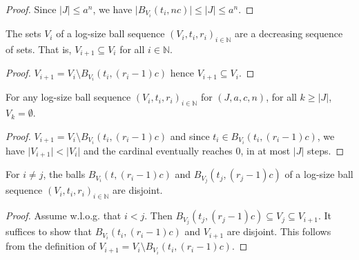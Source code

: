 \begin{proof}
Since $|J| \le a^n$, we have $\vert B_{V_i}(t_i, n c) \vert \le \vert J \vert \le a^{n}$.
\end{proof}


\begin{lemma}\label{lem:logSizeBallSequence_V_anti}
  \leanok
The sets $V_i$ of a log-size ball sequence $(V_i, t_i, r_i)_{i \in \mathbb{N}}$ are a decreasing sequence of sets. That is, $V_{i+1} \subseteq V_i$ for all $i \in \mathbb{N}$.
\end{lemma}

\begin{proof}
$V_{i+1} = V_i \setminus B_{V_i}(t_i, (r_i - 1)c)$ hence $V_{i+1} \subseteq V_i$.
\end{proof}


\begin{lemma}\label{lem:logSizeBallSequence_eq_zero}
  \leanok
For any log-size ball sequence $(V_i, t_i, r_i)_{i \in \mathbb{N}}$ for $(J, a, c, n)$, for all $k \ge \vert J \vert$, $V_k = \emptyset$.
\end{lemma}

\begin{proof}
$V_{i+1} = V_i \setminus B_{V_i}(t_i, (r_i - 1)c)$ and since $t_i \in B_{V_i}(t_i, (r_i - 1)c)$, we have $\vert V_{i+1} \vert < \vert V_i \vert$ and the cardinal eventually reaches $0$, in at most $\vert J \vert$ steps.
\end{proof}


\begin{lemma}\label{lem:logSizeBallSequence_disjoint_B}
  \leanok
For $i \ne j$, the balls $B_{V_i}(t, (r_i-1)c)$ and $B_{V_j}(t_j, (r_j-1)c)$ of a log-size ball sequence $(V_i, t_i, r_i)_{i \in \mathbb{N}}$ are disjoint.
\end{lemma}

\begin{proof}
Assume w.l.o.g. that $i < j$.
Then $B_{V_j}(t_j, (r_j-1)c) \subseteq V_j \subseteq V_{i+1}$.
It suffices to show that $B_{V_i}(t_i, (r_i-1)c)$ and $V_{i+1}$ are disjoint.
This follows from the definition of $V_{i+1} = V_i \setminus B_{V_i}(t_i, (r_i-1)c)$.
\end{proof}


